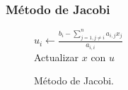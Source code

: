 \documentclass[10pt]{beamer}
\begin{document}
  \begin{frame}
  \frametitle{M\'etodo de Jacobi}
  \begin{center}  
  \begin{figure}[h]            
    \begin{algorithm}[H]     
     \caption{M\'etodo de Jacobi.}
     {
      {
        $u_i \leftarrow \displaystyle\frac{b_i-\displaystyle\sum_{j=1,j\neq i}^na_{i,j}x_j}{a_{i,i}}$\\
      }
      Actualizar $x$ con $u$\\
     }    
    \end{algorithm}
    \end{figure}
  \end{center}
  \end{frame}
\end{document}
